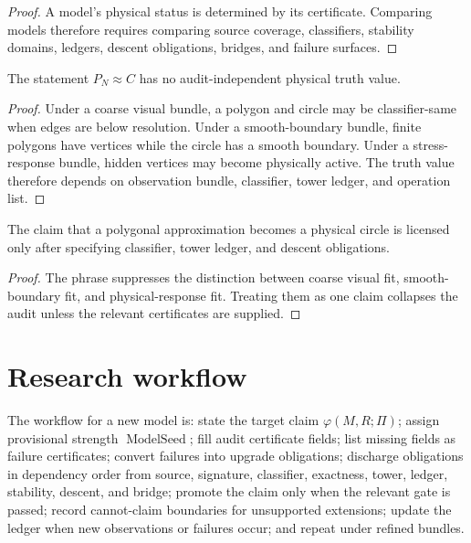 \begin{proof}
A model's physical status is determined by its certificate. Comparing models therefore requires comparing source coverage, classifiers, stability domains, ledgers, descent obligations, bridges, and failure surfaces.
\end{proof}

\begin{theorem}
\label{thm:polygon-circle-audit-relative}
The statement $P_N\approx C$ has no audit-independent physical truth value.
\end{theorem}

\begin{proof}
Under a coarse visual bundle, a polygon and circle may be classifier-same when edges are below resolution. Under a smooth-boundary bundle, finite polygons have vertices while the circle has a smooth boundary. Under a stress-response bundle, hidden vertices may become physically active. The truth value therefore depends on observation bundle, classifier, tower ledger, and operation list.
\end{proof}

\begin{corollary}
\label{cor:polygon-becomes-circle-audit-collapse}
The claim that a polygonal approximation becomes a physical circle is licensed only after specifying classifier, tower ledger, and descent obligations.
\end{corollary}

\begin{proof}
The phrase suppresses the distinction between coarse visual fit, smooth-boundary fit, and physical-response fit. Treating them as one claim collapses the audit unless the relevant certificates are supplied.
\end{proof}

\section{Research workflow}
\label{sec:model-audit-research-workflow}

\begin{definition}
\label{def:research-workflow-new-model}
The workflow for a new model is: state the target claim $\varphi(M,R;\Pi)$; assign provisional strength $\operatorname{ModelSeed}$; fill audit certificate fields; list missing fields as failure certificates; convert failures into upgrade obligations; discharge obligations in dependency order from source, signature, classifier, exactness, tower, ledger, stability, descent, and bridge; promote the claim only when the relevant gate is passed; record cannot-claim boundaries for unsupported extensions; update the ledger when new observations or failures occur; and repeat under refined bundles.
\end{definition}


